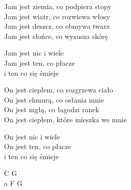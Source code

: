 \begin{text}
    Jam jest ziemia, co podpiera stopy\\
    Jam jest wiatr, co rozwiewa włosy\\
    Jam jest deszcz, co obmywa twarz\\
    Jam jest słońce, co wysusza skórę

    Jam jest nic i wiele\\
    Jam jest ten, co płacze\\
    i ten co się śmieje

    On jest ciepłem, co rozgrzewa ciało\\
    On jest chmurą, co osłania mnie\\
    On jest mgłą, co łagodzi ranek\\
    On jest ciepłem, które mieszka we mnie

    On jest nic i wiele\\
    On jest ten, co płacze\\
    i ten co się śmieje
\end{text}
\begin{chord}
    C G\\
    a F G
\end{chord}